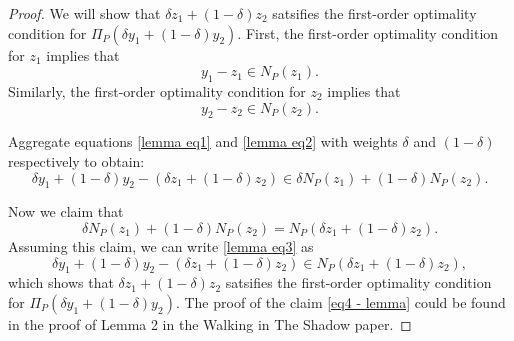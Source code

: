 \documentclass{article}
\begin{document}
\begin{proof}
We will show that $\delta z_1 + (1 - \delta) z_2$ satsifies the first-order optimality condition for $\Pi_P( \delta y_1 + (1 - \delta) y_2)$. First, the first-order optimality condition for $z_1$ implies that
\begin{equation}\label{lemma eq1}
    y_1 - z_1 \in N_P(z_1).
\end{equation}
Similarly, the first-order optimality condition for $z_2$ implies that
\begin{equation}\label{lemma eq2}
    y_2 - z_2 \in N_P(z_2).
\end{equation}

Aggregate equations \eqref{lemma eq1} and \eqref{lemma eq2} with weights $\delta$ and $(1 - \delta)$ respectively to obtain:
\begin{equation}\label{lemma eq3}
    \delta y_1 + (1 - \delta) y_2 - (\delta z_1 + (1 - \delta) z_2) \in \delta N_P(z_1) + (1- \delta) N_P(z_2).
\end{equation}

Now we claim that 
\begin{equation}\label{eq4 - lemma}
        \delta N_P(z_1) + (1 - \delta) N_P(z_2) = N_P(\delta z_1 + (1 - \delta) z_2).
\end{equation}
Assuming this claim, we can write \eqref{lemma eq3} as 
\begin{equation*}
    \delta y_1 + (1 - \delta) y_2 - (\delta z_1 + (1 - \delta) z_2) \in N_P(\delta z_1 + (1 - \delta) z_2),
\end{equation*}
which shows that $\delta z_1 + (1 - \delta) z_2$ satsifies the first-order optimality condition for $\Pi_P( \delta y_1 + (1 - \delta) y_2)$. The proof of the claim \eqref{eq4 - lemma} could be found in the proof of Lemma 2 in the Walking in The Shadow paper.
\end{proof}
\end{document}
